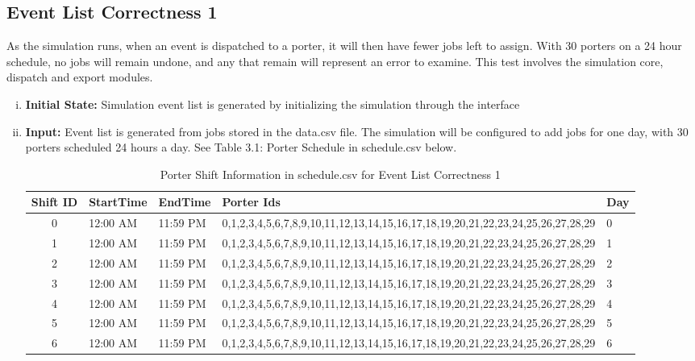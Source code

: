 \documentclass[paper=letter, fontsize=10pt]{scrartcl}
\numberwithin{equation}{section}		%
\numberwithin{figure}{section}			%
\numberwithin{table}{section}				%
\begin{document}
\begin{enumerate}[(i)]
\begin{enumerate}[(i)]
\end{enumerate}

\subsection{Event List Correctness 1}
As the simulation runs, when an event is dispatched to a porter, it will then have fewer jobs left to assign. With 30 porters on a 24 hour schedule, no jobs will remain undone, and any that remain will represent an error to examine. This test involves the simulation core, dispatch and export modules.
\begin{enumerate}[(i)]
	\item \textbf{Initial State:} Simulation event list is generated by initializing the simulation through the interface
	\item \textbf{Input:} Event list is generated from jobs stored in the data.csv file. The simulation will be configured to add jobs for one day, with 30 porters scheduled 24 hours a day. See Table 3.1: Porter Schedule in schedule.csv below.
	\begin{table}
	\caption{Porter Shift Information in schedule.csv for Event List Correctness 1}
	\begin{center}
    	\begin{tabular}{| c | l | l | l | l |}
    		\hline
        	Shift ID & StartTime & EndTime & Porter Ids & Day \\ \hline
  			0 & 12:00 AM & 11:59 PM & 0,1,2,3,4,5,6,7,8,9,10,11,12,13,14,15,16,17,18,19,20,21,22,23,24,25,26,27,28,29 & 0 \\ \hline
  			1 & 12:00 AM & 11:59 PM & 0,1,2,3,4,5,6,7,8,9,10,11,12,13,14,15,16,17,18,19,20,21,22,23,24,25,26,27,28,29 & 1 \\ \hline
  			2 & 12:00 AM & 11:59 PM & 0,1,2,3,4,5,6,7,8,9,10,11,12,13,14,15,16,17,18,19,20,21,22,23,24,25,26,27,28,29 & 2 \\ \hline
  			3 & 12:00 AM & 11:59 PM & 0,1,2,3,4,5,6,7,8,9,10,11,12,13,14,15,16,17,18,19,20,21,22,23,24,25,26,27,28,29 & 3 \\ \hline
  			4 & 12:00 AM & 11:59 PM & 0,1,2,3,4,5,6,7,8,9,10,11,12,13,14,15,16,17,18,19,20,21,22,23,24,25,26,27,28,29 & 4 \\ \hline
  			5 & 12:00 AM & 11:59 PM & 0,1,2,3,4,5,6,7,8,9,10,11,12,13,14,15,16,17,18,19,20,21,22,23,24,25,26,27,28,29 & 5 \\ \hline
  			6 & 12:00 AM & 11:59 PM & 0,1,2,3,4,5,6,7,8,9,10,11,12,13,14,15,16,17,18,19,20,21,22,23,24,25,26,27,28,29 & 6 \\ \hline

\end{tabular}
\end{center}
\end{table}
\end{enumerate}
\end{enumerate}
\end{document}
